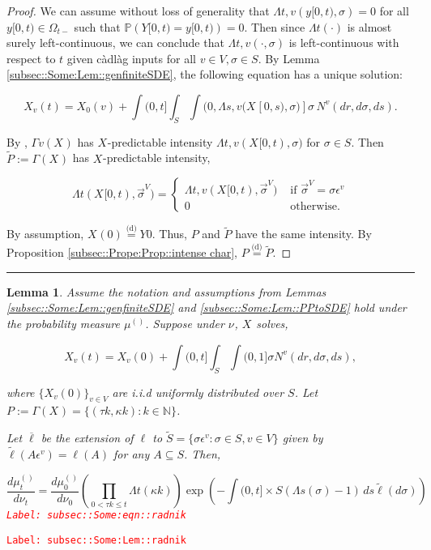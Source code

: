 \documentclass[12pt]{article}
\newcommand{\mb}{\mathbb}
\newcommand{\ov}{\overline}
\newcommand{\te}{\text}
\newcommand{\ep}{\epsilon}
\newcommand{\tr}{\textcolor{red}}
\newcommand{\labe}[1]{\tr{\texttt{Label: #1}}}
\newcommand{\ind}{\hspace{24pt}}
\newcommand{\lin}{\rule{\linewidth}{0.4 pt}}
\newcommand{\pr}{\mb{P}}							%
\newcommand{\deq}{\overset{\text{(d)}}{=}}			%
\newcommand{\defeq}{:=}								%
\renewcommand{\v}{v}							%
\renewcommand{\S}{S}							%
\newcommand{\s}{\sigma}							%
\newcommand{\sv}{\vec{\s}}						%
\newcommand{\ev}{\ep}							%
\renewcommand{\t}{t}							%
\newcommand{\sset}{\Omega}						%
\renewcommand{\tt}{s}							%
\newcommand{\X}{X}								%
\newcommand{\vind}[1]{^{#1}}					%
\newcommand{\vsi}[1]{^{#1}}						%
\newcommand{\cind}[1]{_{#1}}					%
\newcommand{\tp}[1]{(#1)}						%
\newcommand{\tip}[1]{#1}						%
\newcommand{\ts}[1]{_{#1}}						%
\newcommand{\sln}[1]{^{(#1)}}						%
\newcommand{\poiss}{N}							%
\newcommand{\Sm}{\ell}							%
\renewcommand{\r}{r}							%
\newcommand{\alt}[1]{\widetilde{#1}}			%
\newcommand{\m}{\mu}							%
\newcommand{\mm}{\nu}							%
\newcommand{\XX}{Y}								%
\newcommand{\rt}{\tau}							%
\renewcommand{\it}{k}							%
\newcommand{\pmap}{\Gamma}						%
\renewcommand{\mark}{\kappa}					%
\newcommand{\rp}{P}								%
\newcommand{\typset}{A}							%
\newcommand{\ratee}{\Lambda}					%
\newcommand{\xx}{y}								%
\newtheorem{lem}[thms]{Lemma}
\begin{document}
\begin{proof}

We can assume without loss of generality that \(\ratee{\t,\v}(\xx{}{[0,\t)},\s) = 0\) for all \(\xx{}{[0,\t)}\in \sset\vsi{}\ts{\t-}\) such that \(\pr(\XX{}{[0,\t)} = \xx{}{[0,\t)}) = 0\). Then since \(\ratee{\t}(\cdot)\) is almost surely left-continuous, we can conclude that \(\ratee{\t,\v}(\cdot,\s)\) is left-continuous with respect to \(\t\) given c\`adl\`ag inputs for all \(\v\in V,\s\in\S\). By Lemma \ref{subsec::Some:Lem::genfiniteSDE}, the following equation has a unique solution:

\[\X\cind{\v}\tp{\t} = \X\cind{0}\tp{\v} + \int{(0,\t]}\int_\S\int{(0,\ratee{\tt,\v}(\X\cind{}\tip{[0,\tt)},\s)]}  \s\,\poiss\vind{\v}(d\r,d\s,d\tt).\]

By \cite[Exercise 14.7.1]{DalVer08}, \(\pmap{\v}(\X\cind{}\tip{})\) has \(\X\cind{}\tip{}\)-predictable intensity \(\ratee{\t,\v}(\X\cind{}\tip{[0,\t)},\s)\) for \(\s \in \S\). Then \(\alt{\rp{}} \defeq \pmap{}(\X\cind{}\tip{})\) has \(\X\cind{}\tip{}\)-predictable intensity,

\[\ratee{\t}(\X\cind{}\tip{[0,\t)},\sv\cind{}\vsi{V}) = \begin{cases}
\ratee{\t,\v}(\X\cind{}\tip{[0,\t)},\sv\cind{}\vsi{V}) &\te{ if } \sv\cind{}\vsi{V} = \s\ev\vind{\v}\\
0&\te{ otherwise.}
\end{cases}\]

By assumption, \(\X\cind{}\tp{0} \deq \XX{}{0}\). Thus, \(\rp{}\) and \(\alt{\rp{}}\) have the same intensity. By Proposition \ref{subsec::Prope:Prop::intense char}, \(\rp{} \deq \alt{\rp{}}\).
\end{proof}
\lin

\begin{lem}
Assume the notation and assumptions from Lemmas \ref{subsec::Some:Lem::genfiniteSDE} and \ref{subsec::Some:Lem::PPtoSDE} hold under the probability measure \(\m\sln{}\ts{}\). Suppose under \(\mm\vind{}\ts{}\), \(\X\cind{}\tip{}\) solves,

\[\X\cind{\v}\tp{\t} = \X\cind{\v}\tp{0} +\int{(0,\t]}\int_\S\int{(0,1]} \s \poiss\vind{\v}(d\r,d\s,d\tt),\]

where \(\{\X\cind{\v}\tp{0}\}_{\v \in V}\) are i.i.d uniformly distributed over \(\S\). Let \(\rp{} \defeq \pmap{}(\X\cind{}\tip{}) = \{(\rt{\it},\mark{\it}):\it\in \mb{N}\}\).

\ind Let \(\ov{\ell}\) be the extension of \(\Sm\) to \(\alt{\S} = \{\s\ev\vind{\v}: \s \in \S, \v \in V\}\) given by \(\alt{\Sm}(\typset\ev\vind{\v}) = \Sm(\typset)\) for any \(\typset \subseteq \S\). Then,

\begin{equation}
\frac{d\m\sln{}\ts{\t}}{d\mm\vind{}\ts{\t}}= \frac{d\m\sln{}\ts{0}}{d\mm\vind{}\ts{0}}\left(\prod_{0< \rt{\it}\leq \t} \ratee{\t}(\mark{\it})\right)\exp\left(-\int{(0,\t]\times \S} (\ratee{\tt}(\s) - 1)\,d\tt\alt{\Sm}(d\s)\right)
\label{subsec::Some:eqn::radnik}
\end{equation}
\labe{subsec::Some:eqn::radnik}
\label{subsec::Some:Lem::radnik}
\end{lem}
\labe{subsec::Some:Lem::radnik}
\end{document}

